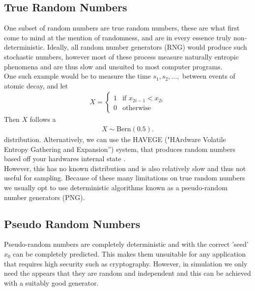 \documentclass{article}
\begin{document}
\subsection{True Random Numbers}
One subset of random numbers are true random numbers, these are what first come to 
mind at the mention of randomness, and are in every essence truly non-deterministic.
Ideally, all random number generators (RNG) would produce such stochastic numbers, 
however most of these process measure naturally entropic phenomena and are thus
slow and unsuited to most computer programs.\\
One such example would be to measure the time $s_1,s_2,\dots,$ between events of atomic decay,
and let 
\begin{align}
 X =
    \begin{cases} 
      1 & \text{if } x_{2i-1}<x_{2i} \\ 
      0 & \text{otherwise}
    \end{cases}
\end{align}
Then $X$ follows a 
\begin{align*}
    X \sim \text{Bern}(0.5).
\end{align*}
distribution.
Alternatively, we can use the HAVEGE ("HArdware Volatile Entropy Gathering and Expansion”)
\label{point: HAVEGE} system,
that produces random numbers based off your hardwares internal state \cite{gentle2003random}. 
\\
However, this has no known distribution and is also relatively slow and thus not useful for sampling.
Because of these many limitations on true random numbers we usually opt to
use deterministic algorithms known as a pseudo-random number generators (PNG).

\subsection{Pseudo Random Numbers}
Pseudo-random numbers are completely deterministic and with the correct 'seed' $x_0$
can be completely predicted. This makes them unsuitable for any application that requires 
high security such as cryptography. However, in simulation we only need the appears that they
are random and independent and this can be achieved with a suitably good generator.
\end{document}
